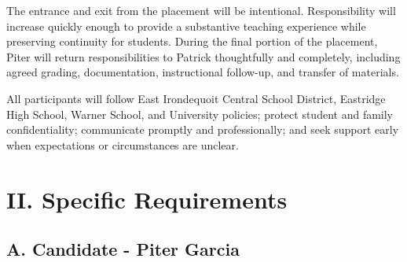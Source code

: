 \documentclass[10pt]{article}
\begin{document}
The entrance and exit from the placement will be intentional. Responsibility will increase quickly enough to provide a substantive teaching experience while preserving continuity for students. During the final portion of the placement, Piter will return responsibilities to Patrick thoughtfully and completely, including agreed grading, documentation, instructional follow-up, and transfer of materials.

All participants will follow East Irondequoit Central School District, Eastridge High School, Warner School, and University policies; protect student and family confidentiality; communicate promptly and professionally; and seek support early when expectations or circumstances are unclear.

\section*{II. Specific Requirements}

\subsection*{A. Candidate - Piter Garcia}
\end{document}

